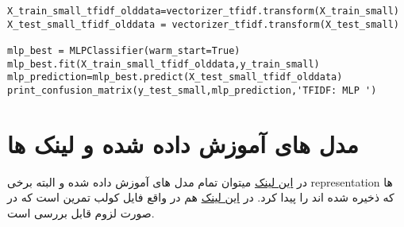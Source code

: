 \documentclass{article}[12pt]
\begin{document}
\begin{verbatim}
X_train_small_tfidf_olddata=vectorizer_tfidf.transform(X_train_small)
X_test_small_tfidf_olddata = vectorizer_tfidf.transform(X_test_small)

mlp_best = MLPClassifier(warm_start=True)
mlp_best.fit(X_train_small_tfidf_olddata,y_train_small)
mlp_prediction=mlp_best.predict(X_test_small_tfidf_olddata)
print_confusion_matrix(y_test_small,mlp_prediction,'TFIDF: MLP ')
\end{verbatim}
\section{مدل های آموزش داده شده و لینک ها}
در 
\href{https://drive.google.com/drive/folders/1D5jG-peWyejoISFjyc0e8d_Y44frkL7f?usp=sharing}{این لینک}
میتوان تمام مدل های آموزش داده شده و البته برخی representation ها که ذخیره شده اند را پیدا کرد. 
در
\href{https://colab.research.google.com/drive/18s13qgUut2uGAMDf2sFACHgbyuzKcymi?usp=sharing}{این لینک}
هم در واقع فایل کولب تمرین است که در صورت لزوم قابل بررسی است. 
\end{document}
